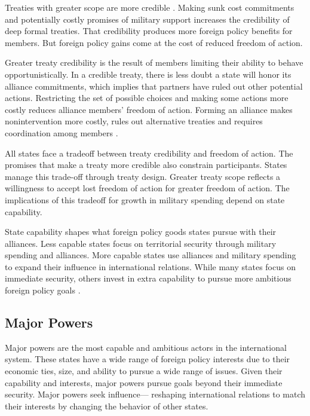 \documentclass[12pt]{article}
\begin{document}
Treaties with greater scope are more credible \citep{Poast2013}. 
Making sunk cost commitments and potentially costly promises of military support increases the credibility of deep formal treaties.
That credibility produces more foreign policy benefits for members. 
But foreign policy gains come at the cost of reduced freedom of action. 


Greater treaty credibility is the result of members limiting their ability to behave opportunistically. 
In a credible treaty, there is less doubt a state will honor its alliance commitments, which implies that partners have ruled out other potential actions. 
Restricting the set of possible choices and making some actions more costly reduces alliance members' freedom of action. 
Forming an alliance makes nonintervention more costly, rules out alternative treaties and requires coordination among members \citep{Snyder1997}. 


All states face a tradeoff between treaty credibility and freedom of action. 
The promises that make a treaty more credible also constrain participants. 
States manage this trade-off through treaty design. 
Greater treaty scope reflects a willingness to accept lost freedom of action for greater freedom of action. 
The implications of this tradeoff for growth in military spending depend on state capability. 


State capability shapes what foreign policy goods states pursue with their alliances. 
Less capable states focus on territorial security through military spending and alliances. 
More capable states use alliances and military spending to expand their influence in international relations. 
While many states focus on immediate security, others invest in extra capability to pursue more ambitious foreign policy goals \citep{Fordham2011, MarkowitzFariss2017}. 


\subsection{Major Powers} 


Major powers are the most capable and ambitious actors in the international system. 
These states have a wide range of foreign policy interests due to their economic ties, size, and ability to pursue a wide range of issues. 
Given their capability and interests, major powers pursue goals beyond their immediate security. 
Major powers seek influence--- reshaping international relations to match their interests by changing the behavior of other states. 
\end{document}

